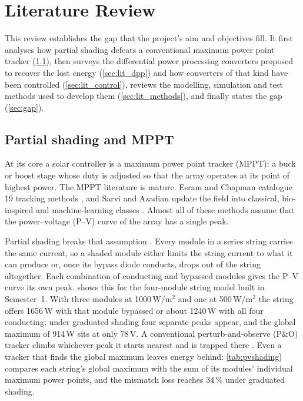 \section{Literature Review}
\label{sec:lit}

This review establishes the gap that the project's aim and objectives fill. It first analyses how partial shading defeats a conventional maximum power point tracker (\cref{sec:lit_shading}), then surveys the differential power processing converters proposed to recover the lost energy (\cref{sec:lit_dpp}) and how converters of that kind have been controlled (\cref{sec:lit_control}), reviews the modelling, simulation and test methods used to develop them (\cref{sec:lit_methods}), and finally states the gap (\cref{sec:gap}).

\subsection{Partial shading and MPPT}
\label{sec:lit_shading}
At its core a solar controller is a maximum power point tracker (MPPT): a buck or boost stage whose duty is adjusted so that the array operates at its point of highest power. The MPPT literature is mature. Esram and Chapman catalogue 19 tracking methods \cite{esram_comparison_2007}, and Sarvi and Azadian update the field into classical, bio-inspired and machine-learning classes \cite{sarvi_comprehensive_2022}. Almost all of these methods assume that the power--voltage (P--V) curve of the array has a single peak.

Partial shading breaks that assumption \cite{belhaouas_pv_2017,bingol_analysis_2018,mehedi_critical_2021}. Every module in a series string carries the same current, so a shaded module either limits the string current to what it can produce or, once its bypass diode conducts, drops out of the string altogether. Each combination of conducting and bypassed modules gives the P--V curve its own peak.  shows this for the four-module string model built in Semester~1. With three modules at 1000\,W/m$^2$ and one at 500\,W/m$^2$ the string offers 1656\,W with that module bypassed or about 1240\,W with all four conducting; under graduated shading four separate peaks appear, and the global maximum of 914\,W sits at only 78\,V. A conventional perturb-and-observe (P\&O) tracker climbs whichever peak it starts nearest and is trapped there \cite{riquelme-dominguez_systematic_2022}. Even a tracker that finds the global maximum leaves energy behind: \cref{tab:pvshading} compares each string's global maximum with the sum of its modules' individual maximum power points, and the mismatch loss reaches 34\,\% under graduated shading.

